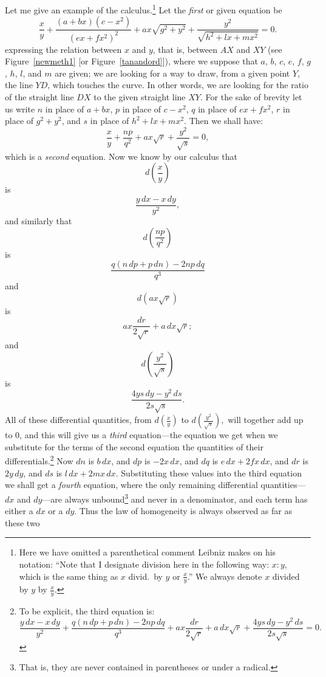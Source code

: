 \documentclass[polutonikogreek,english,twoside,openright]{article}
\begin{document}
\label{bnmex1} Let me give an example of the calculus.\footnote{Here
  we have omitted a parenthetical comment Leibniz makes on his
  notation: ``Note that I designate division here in the following
  way: $x\!:\!y$, which is the same thing as $x$ divid.\ by $y$ or
  $\frac{x}{y}$.''  We always denote $x$ divided by $y$ by
  $\frac{x}{y}.$} Let the {\em first} or given equation be
$$\frac{x}{y} + \frac{(a+bx)(c-x^2)}{(ex+fx^2)^2} + ax\sqrt{g^2 +y^2} +\frac{y^2}{\sqrt{h^2 + lx + mx^2}}= 0.$$
expressing the relation between $x$ and $y$, that is, between $AX$ and
$XY$ (see Figure~\ref{newmeth1} [or Figure~\ref{tanandord}]), where we
suppose that $a$, $b$, $c$, $e$, $f$, $g$, $h$, $l$, and $m$ are
given; we are looking for a way to draw, from a given point $Y$, the
line $YD$, which touches the curve.  In other words, we are looking
for the ratio of the straight line $DX$ to the given straight line
$XY$.  For the sake of brevity let us write $n$ in place of $a+bx$,
$p$ in place of $c-x^2$, $q$ in place of $ex + fx^2$, $r$ in place of
$g^2+y^2$, and $s$ in place of $h^2+lx +mx^2$.  Then we shall have:
$$\frac{x}{y} + \frac{np}{q^2} + ax\sqrt{r} + \frac{y^2}{\sqrt{s}} = 0,$$ which
is a {\em second} equation.  Now we know by our calculus that
$$d\left(\frac{x}{y}\right)$$ is
$$\frac{y\,dx - x\,dy}{y^2},$$ 
and similarly that
$$d\left(\frac{np}{q^2}\right)$$ is
$$ \frac{q(n\,dp + p\,dn) -2np\,dq}{q^3}$$ and
$$d(ax\sqrt{r})$$ is
$$ax\frac{dr}{2\sqrt{r}} + a\,dx\sqrt{r};$$ and 
$$d\left(\frac{y^2}{\sqrt{s}}\right)$$ is
$$  \frac{4ys\,dy   - y^2\,ds}{2s\sqrt{s}}.$$ All of these
differential quantities, from $d(\frac{x}{y})$ to
$d(\frac{y^2}{\sqrt{s}}),$ will together add up to 0, and this will
give us a {\em third} equation---the equation we get when we
substitute for the terms of the second equation the quantities of
their differentials.\footnote{To be explicit, the third equation is:
$$\frac{y\,dx - x\,dy}{y^2} + \frac{q(n\,dp + p\,dn) -2np\,dq}{q^3} + ax\frac{dr}{2\sqrt{r}} + a\,dx\sqrt{r} + \frac{4ys\,dy   - y^2\,ds}{2s\sqrt{s}} = 0.$$}  Now $dn$ is $b\,dx$, and $dp$ is
$-2x\,dx$, and $dq$ is $e\,dx + 2fx\,dx$, and $dr$ is $2y\,dy$, and
$ds$ is $l\,dx + 2mx\,dx$.  Substituting these values into the third
equation we shall get a {\em fourth} equation, where the only
remaining differential quantities---$dx$ and $dy$---are always
unbound\footnote{That is, they are never contained in parentheses or
  under a radical.}  and never in a denominator, and each term has
either a $dx$ or a $dy$.  Thus the law of homogeneity is always observed as far as these two
\end{document}
